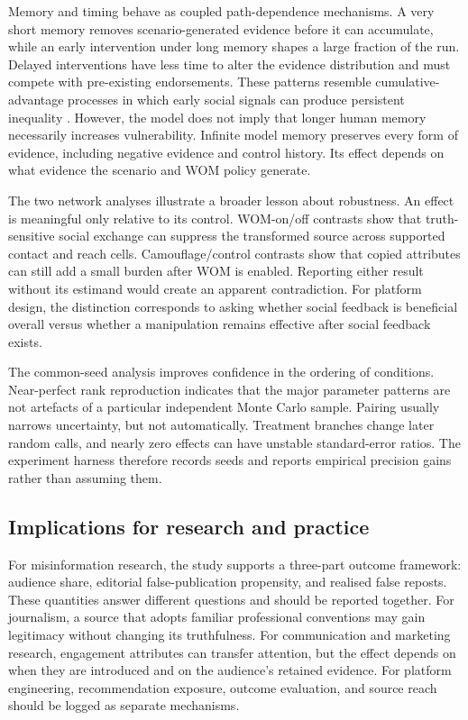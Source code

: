 Memory and timing behave as coupled path-dependence mechanisms. A very short memory removes scenario-generated evidence before it can accumulate, while an early intervention under long memory shapes a large fraction of the run. Delayed interventions have less time to alter the evidence distribution and must compete with pre-existing endorsements. These patterns resemble cumulative-advantage processes in which early social signals can produce persistent inequality \citep{salganik2006,muchnik2013}. However, the model does not imply that longer human memory necessarily increases vulnerability. Infinite model memory preserves every form of evidence, including negative evidence and control history. Its effect depends on what evidence the scenario and WOM policy generate.

The two network analyses illustrate a broader lesson about robustness. An effect is meaningful only relative to its control. WOM-on/off contrasts show that truth-sensitive social exchange can suppress the transformed source across supported contact and reach cells. Camouflage/control contrasts show that copied attributes can still add a small burden after WOM is enabled. Reporting either result without its estimand would create an apparent contradiction. For platform design, the distinction corresponds to asking whether social feedback is beneficial overall versus whether a manipulation remains effective after social feedback exists.

The common-seed analysis improves confidence in the ordering of conditions. Near-perfect rank reproduction indicates that the major parameter patterns are not artefacts of a particular independent Monte Carlo sample. Pairing usually narrows uncertainty, but not automatically. Treatment branches change later random calls, and nearly zero effects can have unstable standard-error ratios. The experiment harness therefore records seeds and reports empirical precision gains rather than assuming them.

\subsection{Implications for research and practice}

For misinformation research, the study supports a three-part outcome framework: audience share, editorial false-publication propensity, and realised false reposts. These quantities answer different questions and should be reported together. For journalism, a source that adopts familiar professional conventions may gain legitimacy without changing its truthfulness. For communication and marketing research, engagement attributes can transfer attention, but the effect depends on when they are introduced and on the audience's retained evidence. For platform engineering, recommendation exposure, outcome evaluation, and source reach should be logged as separate mechanisms.

